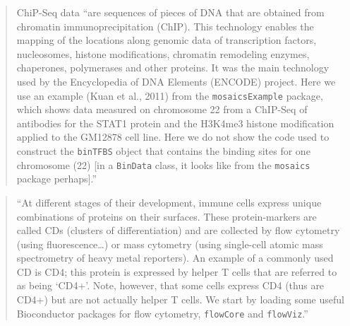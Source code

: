 \documentclass[]{tufte-book}
\begin{document}
\begin{quote}
ChiP-Seq data ``are sequences of pieces of DNA that are obtained from chromatin
immunoprecipitation (ChIP). This technology enables the mapping of the locations
along genomic data of transcription factors, nucleosomes, histone modifications,
chromatin remodeling enzymes, chaperones, polymerases and other proteins. It was
the main technology used by the Encyclopedia of DNA Elements (ENCODE) project.
Here we use an example (Kuan et al., 2011) from the \texttt{mosaicsExample} package,
which shows data measured on chromosome 22 from a ChIP-Seq of antibodies for the
STAT1 protein and the H3K4me3 histone modification applied to the GM12878 cell
line. Here we do not show the code used to construct the \texttt{binTFBS} object that
contains the binding sites for one chromosome (22) {[}in a \texttt{BinData} class, it
looks like from the \texttt{mosaics} package perhaps{]}.'' \citep{holmes2018modern}
\end{quote}

\begin{quote}
``At different stages of their development, immune cells express unique
combinations of proteins on their surfaces. These protein-markers are called
CDs (clusters of differentiation) and are collected by flow cytometry
(using fluorescence\ldots) or mass cytometry (using single-cell atomic mass
spectrometry of heavy metal reporters). An example of a commonly used CD is
CD4; this protein is expressed by helper T cells that are referred to as
being `CD4+'. Note, however, that some cells express CD4 (thus are CD4+)
but are not actually helper T cells. We start by loading some useful Bioconductor
packages for flow cytometry, \texttt{flowCore} and \texttt{flowViz}.'' \citep{holmes2018modern}
\end{quote}
\end{document}
